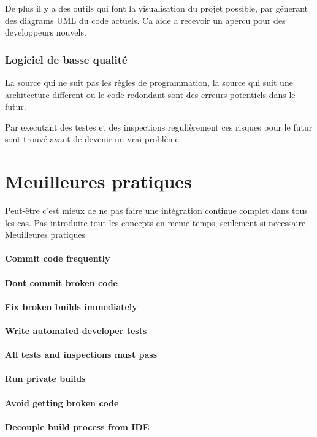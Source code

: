 De plus il y a des outils qui font la visualisation du projet possible, par génerant des diagrams UML du code actuels. Ca aide a recevoir un apercu pour des developpeurs nouvels.
\subsubsection{Logiciel de basse qualité }
La source qui ne suit pas les règles de programmation, la source qui suit une architecture different ou le code redondant sont des erreurs potentiels dans le futur.

Par executant des testes et des inspections regulièrement ces risques pour le futur sont trouvé avant de devenir un vrai problème.

\section{Meuilleures pratiques}
\label{sec:meuilleurespratiques}
Peut-être c'est mieux de ne pas faire une intégration continue complet dans tous les cas. Pas introduire tout les concepts en meme temps, seulement si necessaire.
Meuilleures pratiques

\paragraph{Commit code frequently}

\paragraph{Dont commit broken code}

\paragraph{Fix broken builds immediately}

\paragraph{Write automated developer tests}

\paragraph{All tests and inspections must pass}

\paragraph{Run private builds}

\paragraph{Avoid getting broken code}

\paragraph{Decouple build process from IDE}